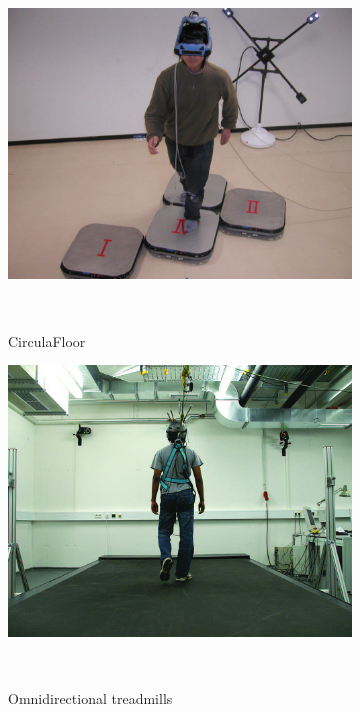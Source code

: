 \begin{figure}
	\centering
	\begin{subfigure}[b]{0.38\columnwidth}
		\includegraphics[width=\textwidth]{./figures/01381227}
		\caption{CirculaFloor\newline}~\label{fig:cirFloor}
	\end{subfigure}
	\begin{subfigure}[b]{0.38\columnwidth}
		\includegraphics[width=\textwidth]{./figures/ACM_TAP_2010}
		\caption{Omnidirectional treadmills}~\label{fig:omniTread}
	\end{subfigure}
	\begin{subfigure}[b]{0.21\columnwidth}

\end{subfigure}
\end{figure}
